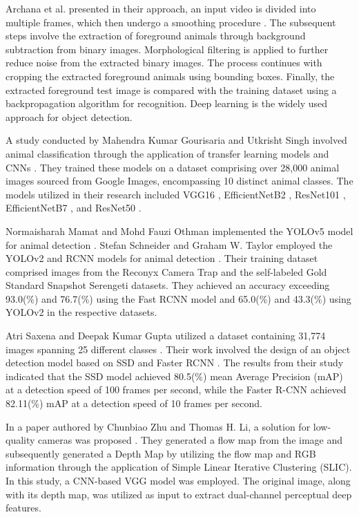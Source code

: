 \documentclass[conference]{IEEEtran}
\begin{document}
Archana et al. presented in their approach, an input video is divided into multiple frames, which then undergo a smoothing procedure \cite{archana2017artificial}. The subsequent steps involve the extraction of foreground animals through background subtraction from binary images. Morphological filtering is applied to further reduce noise from the extracted binary images. The process continues with cropping the extracted foreground animals using bounding boxes. Finally, the extracted foreground test image is compared with the training dataset using a backpropagation algorithm for recognition. Deep learning is the widely used approach for object detection.

A study conducted by Mahendra Kumar Gourisaria and Utkrisht Singh involved animal classification through the application of transfer learning models and CNNs \cite{gourisaria2022performance}. They trained these models on a dataset comprising over 28,000 animal images sourced from Google Images, encompassing 10 distinct animal classes. The models utilized in their research included VGG16 \cite{simonyan2014very}, EfficientNetB2 \cite{tan2019efficientnet}, ResNet101 \cite{he2016deep}, EfficientNetB7 \cite{tan2019efficientnet}, and ResNet50 \cite{he2016deep}.

Normaisharah Mamat and Mohd Fauzi Othman implemented the YOLOv5 model for animal detection \cite{mamat2022animal}. Stefan Schneider and Graham W. Taylor employed the YOLOv2 and RCNN models for animal detection \cite{schneider2018deep}. Their training dataset comprised images from the Reconyx Camera Trap and the self-labeled Gold Standard Snapshot Serengeti datasets. They achieved an accuracy exceeding 93.0(\%) and 76.7(\%) using the Fast RCNN model and 65.0(\%) and 43.3(\%) using YOLOv2 in the respective datasets.

Atri Saxena and Deepak Kumar Gupta utilized a dataset containing 31,774 images spanning 25 different classes \cite{saxena2021animal}. Their work involved the design of an object detection model based on SSD \cite{liu2016ssd} and Faster RCNN \cite{ren2015faster}. The results from their study indicated that the SSD model achieved 80.5(\%) mean Average Precision (mAP) at a detection speed of 100 frames per second, while the Faster R-CNN achieved 82.11(\%) mAP at a detection speed of 10 frames per second.

In a paper authored by Chunbiao Zhu and Thomas H. Li, a solution for low-quality cameras was proposed \cite{zhu2017towards}. They generated a flow map from the image and subsequently generated a Depth Map by utilizing the flow map and RGB information through the application of Simple Linear Iterative Clustering (SLIC). In this study, a CNN-based VGG model was employed. The original image, along with its depth map, was utilized as input to extract dual-channel perceptual deep features.
\end{document}
